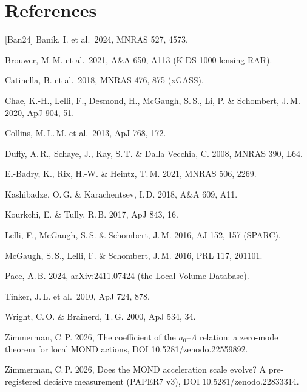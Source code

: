 \documentclass[10pt]{article}
\begin{document}
\section*{References}
\footnotesize
[Ban24] Banik, I. et al.\ 2024, MNRAS 527, 4573.\par
[Bro21] Brouwer, M.\,M. et al.\ 2021, A\&A 650, A113 (KiDS-1000 lensing RAR).\par
[Cat18] Catinella, B. et al.\ 2018, MNRAS 476, 875 (xGASS).\par
[Cha20] Chae, K.-H., Lelli, F., Desmond, H., McGaugh, S.\,S., Li, P. \& Schombert, J.\,M. 2020, ApJ 904, 51.\par
[Col13] Collins, M.\,L.\,M. et al.\ 2013, ApJ 768, 172.\par
[Duf08] Duffy, A.\,R., Schaye, J., Kay, S.\,T. \& Dalla Vecchia, C. 2008, MNRAS 390, L64.\par
[EBRH21] El-Badry, K., Rix, H.-W. \& Heintz, T.\,M. 2021, MNRAS 506, 2269.\par
[KK18] Kashibadze, O.\,G. \& Karachentsev, I.\,D. 2018, A\&A 609, A11.\par
[KT17] Kourkchi, E. \& Tully, R.\,B. 2017, ApJ 843, 16.\par
[LMS16] Lelli, F., McGaugh, S.\,S. \& Schombert, J.\,M. 2016, AJ 152, 157 (SPARC).\par
[MLS16] McGaugh, S.\,S., Lelli, F. \& Schombert, J.\,M. 2016, PRL 117, 201101.\par
[Pac24] Pace, A.\,B. 2024, arXiv:2411.07424 (the Local Volume Database).\par
[Tin10] Tinker, J.\,L. et al.\ 2010, ApJ 724, 878.\par
[WB00] Wright, C.\,O. \& Brainerd, T.\,G. 2000, ApJ 534, 34.\par
[Z26a] Zimmerman, C.\,P. 2026, The coefficient of the $a_0$--$\Lambda$ relation: a zero-mode theorem for local MOND actions, DOI 10.5281/zenodo.22559892.\par
[Z26c] Zimmerman, C.\,P. 2026, Does the MOND acceleration scale evolve? A pre-registered decisive measurement (PAPER7 v3), DOI 10.5281/zenodo.22833314.\par
\end{document}
